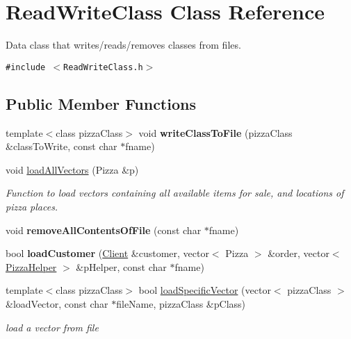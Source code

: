 \hypertarget{class_read_write_class}{
\section{Read\-Write\-Class Class Reference}
\label{class_read_write_class}
}
Data class that writes/reads/removes classes from files.  


{\tt \#include $<$Read\-Write\-Class.h$>$}

\subsection*{Public Member Functions}
\begin{CompactItemize}
\item 
\hypertarget{class_read_write_class_abb1ed8e2de573d0548c582c8df29de1}{
template$<$class pizza\-Class$>$ void {\bf write\-Class\-To\-File} (pizza\-Class \&class\-To\-Write, const char $\ast$fname)}
\label{class_read_write_class_abb1ed8e2de573d0548c582c8df29de1}

\item 
\hypertarget{class_read_write_class_7a6da2d64d652963e15693695f38b019}{
void \hyperlink{class_read_write_class_7a6da2d64d652963e15693695f38b019}{load\-All\-Vectors} (Pizza \&p)}
\label{class_read_write_class_7a6da2d64d652963e15693695f38b019}

\begin{CompactList}\small\item\em Function to load vectors containing all available items for sale, and locations of pizza places. \item\end{CompactList}\item 
\hypertarget{class_read_write_class_40de8d6c8e60d97ea037a48a0096fcfb}{
void {\bf remove\-All\-Contents\-Of\-File} (const char $\ast$fname)}
\label{class_read_write_class_40de8d6c8e60d97ea037a48a0096fcfb}

\item 
\hypertarget{class_read_write_class_3ec01a0a3f0e393ebe888dcdd9cdf0c9}{
bool {\bf load\-Customer} (\hyperlink{class_client}{Client} \&customer, vector$<$ Pizza $>$ \&order, vector$<$ \hyperlink{class_pizza_helper}{Pizza\-Helper} $>$ \&p\-Helper, const char $\ast$fname)}
\label{class_read_write_class_3ec01a0a3f0e393ebe888dcdd9cdf0c9}

\item 
\hypertarget{class_read_write_class_c853fce40cfb6790d054df75b933889f}{
template$<$class pizza\-Class$>$ bool \hyperlink{class_read_write_class_c853fce40cfb6790d054df75b933889f}{load\-Specific\-Vector} (vector$<$ pizza\-Class $>$ \&load\-Vector, const char $\ast$file\-Name, pizza\-Class \&p\-Class)}
\label{class_read_write_class_c853fce40cfb6790d054df75b933889f}

\begin{CompactList}\small\item\em load a vector from file \item\end{CompactList}\end{CompactItemize}
